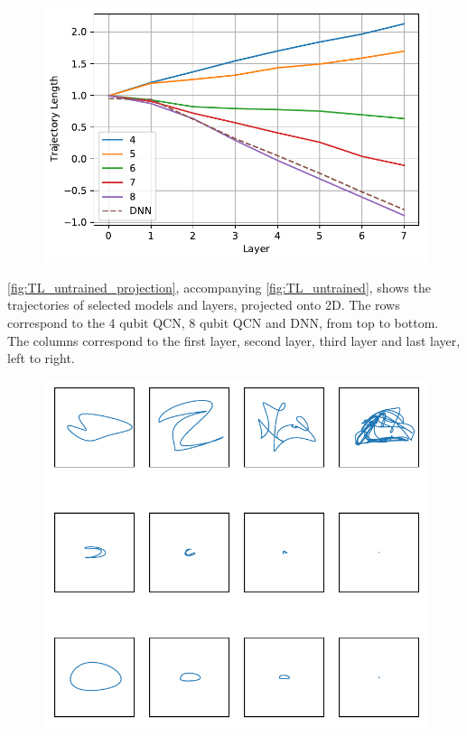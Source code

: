 \begin{figure}[H]
    \centering
    \includegraphics[width=12cm]{latex/figures/TL_untrained.pdf}
    \caption{}
    \label{fig:TL_untrained}
\end{figure}

\autoref{fig:TL_untrained_projection}, accompanying \autoref{fig:TL_untrained}, shows the trajectories of selected models and layers, projected onto 2D. The rows correspond to the 4 qubit QCN, 8 qubit QCN and DNN, from top to bottom. The columns correspond to the first layer, second layer, third layer and last layer, left to right.   

\begin{figure}[H]
    \centering
    \includegraphics[width=12cm]{latex/figures/TL_untrained_projection.pdf}
    \caption{}
    \label{fig:TL_untrained_projection}
\end{figure}

